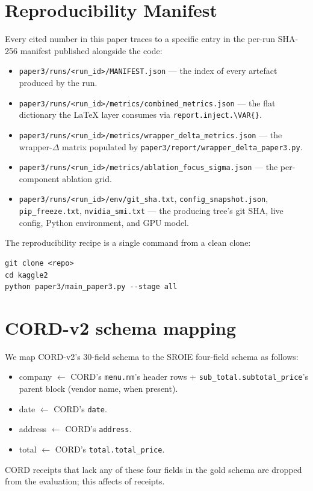 \appendix

\section{Reproducibility Manifest}
\label{sec:appendix_manifest}

Every cited number in this paper traces to a specific entry in the
per-run SHA-256 manifest published alongside the code:

\begin{itemize}
\item \texttt{paper3/runs/<run\_id>/MANIFEST.json} --- the index
      of every artefact produced by the run.
\item \texttt{paper3/runs/<run\_id>/metrics/combined\_metrics.json}
      --- the flat dictionary the LaTeX layer consumes via
      \texttt{report.inject.\textbackslash VAR\{\}}.
\item \texttt{paper3/runs/<run\_id>/metrics/wrapper\_delta\_metrics.json}
      --- the wrapper-$\Delta$ matrix populated by
      \texttt{paper3/report/wrapper\_delta\_paper3.py}.
\item \texttt{paper3/runs/<run\_id>/metrics/ablation\_focus\_sigma.json}
      --- the per-component ablation grid.
\item \texttt{paper3/runs/<run\_id>/env/git\_sha.txt},
      \texttt{config\_snapshot.json}, \texttt{pip\_freeze.txt},
      \texttt{nvidia\_smi.txt} --- the producing tree's git SHA,
      live config, Python environment, and GPU model.
\end{itemize}

The reproducibility recipe is a single command from a clean clone:

\begin{verbatim}
git clone <repo>
cd kaggle2
python paper3/main_paper3.py --stage all
\end{verbatim}

\section{CORD-v2 schema mapping}
\label{app:cord_schema}

We map CORD-v2's 30-field schema to the SROIE four-field schema as
follows:

\begin{itemize}
\item \textsf{company} $\leftarrow$ CORD's \texttt{menu.nm}'s
      header rows + \texttt{sub\_total.subtotal\_price}'s parent
      block (vendor name, when present).
\item \textsf{date} $\leftarrow$ CORD's \texttt{date}.
\item \textsf{address} $\leftarrow$ CORD's \texttt{address}.
\item \textsf{total} $\leftarrow$ CORD's \texttt{total.total\_price}.
\end{itemize}

CORD receipts that lack any of these four fields in the gold
schema are dropped from the evaluation; this affects
 of  receipts.
